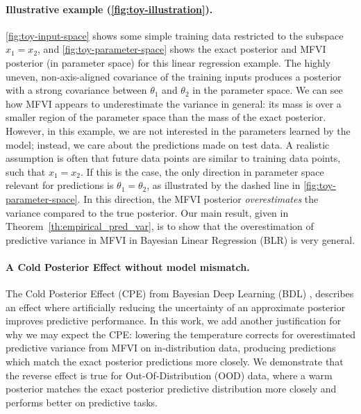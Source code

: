 \documentclass{article}
\theoremstyle{plain}
\theoremstyle{definition}
\theoremstyle{remark}
\theoremstyle{plain}
\begin{document}
\paragraph{Illustrative example (\cref{fig:toy-illustration}).} \cref{fig:toy-input-space} shows some simple training data restricted to the subspace $x_1=x_2$, and \cref{fig:toy-parameter-space} shows the exact posterior and MFVI posterior (in parameter space) for this linear regression example. 
The highly uneven, non-axis-aligned covariance of the training inputs produces a posterior with a strong covariance between $\theta_1$ and $\theta_2$ in the parameter space. %
We can see how MFVI appears to underestimate the variance in general: its mass is over a smaller region of the parameter space than the mass of the exact posterior. 
However, in this example, we are not interested in the parameters learned by the model; instead, we care about the predictions made on test data. 
A realistic assumption is often that future data points are similar to training data points, such that $x_1 = x_2$. 
If this is the case, the only direction in parameter space relevant for predictions is $\theta_1 = \theta_2$, as illustrated by the dashed line in \cref{fig:toy-parameter-space}. 
In this direction, the MFVI posterior \textit{overestimates} the variance compared to the true posterior. Our main result, given in Theorem~\ref{th:empirical_pred_var}, is to show that the overestimation of predictive variance in MFVI in Bayesian Linear Regression (BLR) is very general. 




\paragraph{A Cold Posterior Effect without model mismatch. } The Cold Posterior Effect (CPE) from Bayesian Deep Learning (BDL) \cite{wenzel2020good}, describes an effect where artificially reducing the uncertainty of an approximate posterior improves predictive performance. In this work, we add another justification for why we may expect the CPE: lowering the temperature corrects for overestimated predictive variance from MFVI on in-distribution data,  producing predictions which match the exact posterior predictions more closely. We demonstrate that the reverse effect is true for Out-Of-Distribution (OOD) data, where a warm posterior matches the exact posterior predictive distribution more closely and performs better on predictive tasks. 
\end{document}
